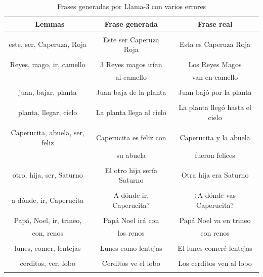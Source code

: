 \documentclass[11pt,spanish,listoffigures,listoftables]{tfgetsinf}
\begin{document}
\begin{table}[!h]
\caption{Frases generadas por Llama-3 con varios errores}
\begin{center}
\begin{tabular}{ c | c | c }
	\ Lemmas & Frase generada & Frase real \\
	\hline
	\hline
	 & & \\
	 este, ser, Caperuza, Roja & Este ser Caperuza Roja & Esta es Caperuza Roja  \\
	 & & \\
	Reyes, mago, ir, camello & 3 Reyes magos irían & Los Reyes Magos \\
	 & al camello & van en camello \\
	 & & \\
	juan, bajar, planta & Juan baja de la planta & Juan bajó por la planta \\
	 & & \\
	planta, llegar, cielo & La planta llega al cielo & La planta llegó hasta el cielo \\
	 & & \\
	Caperucita, abuela, ser, feliz & Caperucita es feliz con & Caperucita y la abuela  \\
	 & su abuela & fueron felices \\
	 & & \\
	otro, hija, ser, Saturno & El otro hija sería Saturno & Otra hija era Saturno \\
	 & & \\
	a dónde, ir, Caperucita & A dónde ir, Caperucita? & ¿A dónde vas Caperucita? \\
	 & & \\
	Papá, Noel, ir, trineo,  & Papá Noel irá con & Papá Noel va en trineo \\
	con, renos & los renos & con renos \\
	 & & \\
	lunes, comer, lentejas & Lunes como lentejas & El lunes comeré lentejas \\
	 & & \\
	cerditos, ver, lobo & Cerditos ve el lobo & Los cerditos ven al lobo \\
	 & & \\

\end{tabular}
\end{center}
\label{tab:erroresVariados}
\end{table}

\end{document}
